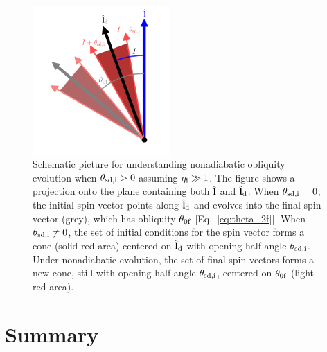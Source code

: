 \begin{figure}
    \centering
    \includegraphics[width=0.47\textwidth]{plots_diskdisp/2_nonad_rot_cropped.png}
    \caption{Schematic picture for understanding nonadiabatic obliquity
    evolution when $\theta_{\rm sd, i} > 0$ assuming $\eta_{\rm i} \gg 1$. The
    figure shows a projection onto the plane containing both $\hat{\boldsymbol{\mathbf{l}}}$ and
    $\hat{\boldsymbol{\mathbf{l}}}_{\rm d}$. When $\theta_{\rm sd, i} = 0$, the initial spin vector
    points along $\hat{\boldsymbol{\mathbf{l}}}_{\rm d}$ and evolves into the final spin vector (grey),
    which has obliquity $\theta_{\rm 0f}$ [Eq.~\eqref{eq:theta_2f}]. When
    $\theta_{\rm sd, i} \neq 0$, the set of initial conditions for the spin
    vector forms a cone (solid red area) centered on $\hat{\boldsymbol{\mathbf{l}}}_{\rm d}$ with
    opening half-angle $\theta_{\rm sd, i}$. Under nonadiabatic evolution, the
    set of final spin vectors forms a new cone, still with opening half-angle
    $\theta_{\rm sd, i}$, centered on $\theta_{\rm 0f}$ (light red
    area).}\label{fig:2nonadrot}
\end{figure}

\section{Summary}\label{s:disk}

